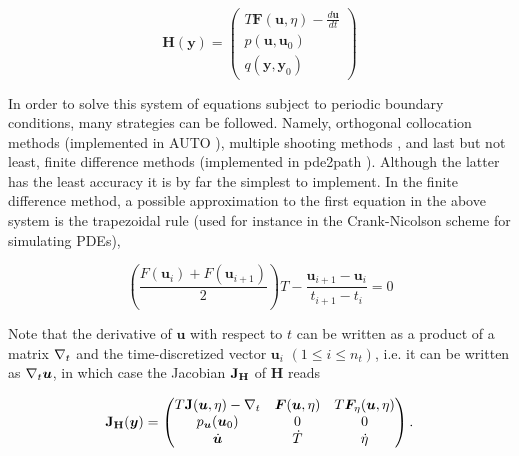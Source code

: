 \begin{equation}
    \bm{H(\bm{y})} = \begin{pmatrix}
       T \bm{F}(\bm{u}, \eta) - \frac{d\bm{u}}{dt} \\
    p(\bm{u}, \bm{u}_0) \\
    q(\bm{y}, \bm{y}_0)
    \end{pmatrix}
\end{equation}


In order to solve this system of equations subject to periodic boundary conditions, many strategies can be followed. Namely, orthogonal collocation methods
(implemented in AUTO \cite{doedel1981auto}), multiple shooting methods \cite{keller1968numerical}, and last but not least, finite difference methods
(implemented in pde2path \cite{Uecker2017pde2path}). Although the latter has the least accuracy it is by far the 
simplest to implement. In the finite difference method, a possible approximation to the
first equation in the above system is the trapezoidal rule (used for instance in the Crank-Nicolson
scheme for simulating PDEs),

\begin{equation}
    \left( \dfrac{F(\bm{u}_i) + F(\bm{u}_{i+1})}{2} \right) T 
        - \dfrac{\bm{u}_{i+1} - \bm{u}_{i}}{t_{i+1} - t_i} = 0
\end{equation}

Note that the derivative of $\bm{u}$ with respect to $t$ can be written as a product
of a matrix $\mathbf{\nabla}_t$ and the time-discretized vector $\bm{u}_i$ $(1 \leq i \leq n_t)$, i.e.
it can be written as $\mathbf{\nabla}_t\bm{u}$, in which case the Jacobian $\mathbf{J_H}$ of $\bm{H}$
reads

\begin{equation}
    \mathbf{J_H}(\bm{y}) = \begin{pmatrix}
        T \mathbf{J}(\bm{u}, \eta) - \mathbf{\nabla}_t & \bm{F}(\bm{u}, \eta) &  T\bm{F}_\eta(\bm{u}, \eta)\\
        p_{\bm{u}}(\bm{u}_0) & 0 & 0 \\
        \dot{\bm{u}} & \dot{T} & \dot{\eta} \\
    \end{pmatrix}.
\end{equation}
